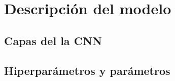 \chapter{Descripción del modelo}\label{ch:DescripModelo}


\section{Capas del la CNN}


\section{Hiperparámetros y parámetros}

